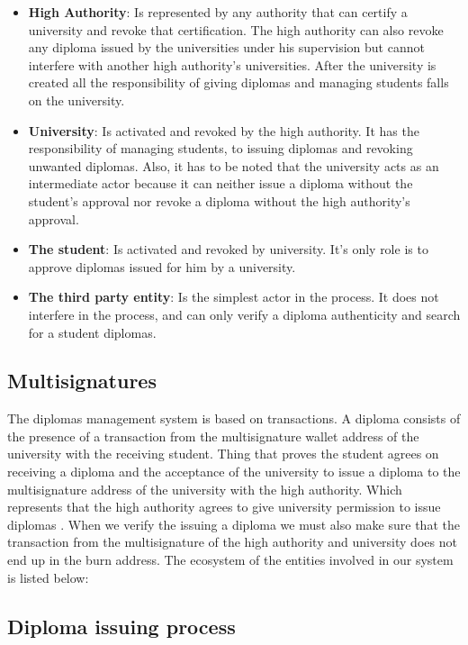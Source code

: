 \documentclass[conference]{IEEEtran}
\begin{document}
\begin{itemize}
    \item \textbf{High Authority}: Is represented by any authority that can certify a university and revoke that certification. The high authority can also revoke any diploma issued by the universities under his supervision but cannot interfere with another high authority's universities. After the university is created all the responsibility of giving diplomas and managing students falls on the university. 
    
    \item \textbf{University}: Is activated and revoked by the high authority. It has the responsibility of managing students, to issuing diplomas and revoking unwanted diplomas. Also, it has to be noted that the university acts as an intermediate actor because it can neither issue a diploma without the student's approval nor revoke a diploma without the high authority's approval.
    
    \item \textbf{The student}: Is activated and revoked by university. It's only role is to approve diplomas issued for him by a university.
    
    \item \textbf{The third party entity}: Is the simplest actor in the process. It does not interfere in the process, and can only verify a diploma authenticity and search for a student diplomas.
\end{itemize}

\subsection{Multisignatures}
The diplomas management system is based on transactions. A diploma consists of the presence of a transaction from the multisignature wallet address of the university with the receiving student. Thing that proves the student agrees on receiving a diploma and the acceptance of the university to issue a diploma to the multisignature address of the university with the high authority. Which represents that the high authority agrees to give university permission to issue diplomas . When we verify the issuing a diploma we must also make sure that the transaction from the multisignature of the high authority and university does not end up in the burn address.
The ecosystem of the entities involved in our system is listed below:

\subsection{Diploma issuing process}
\end{document}
